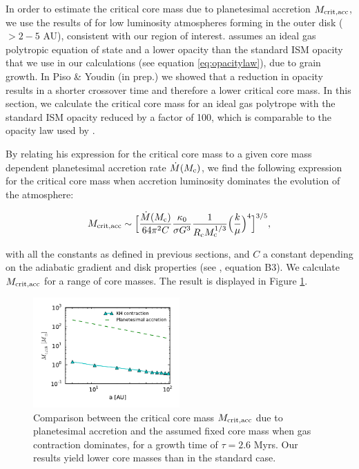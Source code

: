 \documentclass[apj]{emulateapj}
\newcommand{\co}{_{\rm c}}
\begin{document}
In order to estimate the critical core mass due to planetesimal accretion $M_{\rm{crit,acc}}$, we use the results of \citet{rafikov06} for low luminosity atmospheres forming in the outer disk ($>2-5$ AU), consistent with our region of interest. \citet{rafikov06} assumes an ideal gas polytropic equation of state and a lower opacity than the standard ISM opacity that we use in our calculations (see equation \ref{eq:opacitylaw}), due to grain growth. In Piso \& Youdin (in prep.) we showed that a reduction in opacity results in a shorter crossover time and therefore a lower critical core mass. In this section, we calculate the critical core mass for an ideal gas polytrope with the standard ISM opacity reduced by a factor of 100, which is comparable to the opacity law used by \citet{rafikov06}. 

By relating his expression for the critical core mass to a given core mass dependent planetesimal accretion rate $\dot{M}(M_{\rm{c}})$, we find the following expression for the critical core mass when accretion luminosity dominates the evolution of the atmosphere:

\begin{equation}
\label{eq:critraf}
M_{\rm{crit, acc}} \sim \Big[\frac{\dot{M}(M_{\rm{c}})}{64 \pi^2 C} \frac{\kappa_0}{\sigma G^3} \frac{1}{R\co M\co^{1/3}} \Big(\frac{k}{\mu}\Big)^4\Big]^{3/5},
\end{equation}

\noindent with all the constants as defined in previous sections, and $C$ a constant depending on the adiabatic gradient and disk properties (see \citealt{rafikov06}, equation B3). We calculate $M_{\rm{crit,acc}}$ for a range of core masses. The result is displayed in Figure \ref{fig:raf2}. 

 \begin{figure}[h]
\centering
\includegraphics[width=0.5\textwidth]{../../figs/ModelAtmospheres/RadSelfGravRealEOS/Mc_vs_a_poly_raf2_paper.pdf}
\caption{Comparison between the critical core mass $M_{\rm{crit, acc}}$ due to planetesimal accretion and the assumed fixed core mass when gas contraction dominates, for a growth time of $\tau=2.6$ Myrs. Our results yield lower core masses than in the standard case.}
\label{fig:raf2}
\end{figure}
\end{document}
